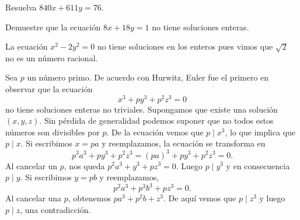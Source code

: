 %

\begin{exercise}
	Resuelva $840x+611y=76$. 
\end{exercise}

\begin{exercise}
	Demuestre que la ecuación $8x+18y=1$ no tiene soluciones enteras.
\end{exercise}

\begin{example}
	La ecuación $x^2-2y^2=0$ no tiene soluciones en los enteros pues vimos que
	$\sqrt{2}$ no es un número racional. 
\end{example}

\begin{example}
	Sea $p$ un número primo.  De acuerdo con Hurwitz, Euler fue el primero en
	observar que la ecuación
	\[
		x^3+py^3+p^2z^3=0
	\]
	no tiene soluciones enteras no triviales. Supongamos que existe una
	solución $(x,y,z)$. Sin pérdida de generalidad podemos suponer que no todos
	estos números son divisibles por $p$. De la ecuación vemos que $p\mid x^3$,
	lo que implica que $p\mid x$. Si escribimos $x=pa$ y reemplazamos, la
	ecuación se transforma en 
	\[
		p^3a^3+py^3+p^2z^3=(pa)^3+py^3+p^2z^3=0.
	\]
	Al cancelar un $p$, nos queda $p^2a^3+y^3+pz^3=0$. Luego $p\mid y^3$ y en consecuencia $p\mid y$. Si escribimos
	$y=pb$ y reemplazamos, 
	\[
		p^2a^3+p^3b^3+pz^3=0.
	\]
	Al cancelar una $p$, obtenemos $pa^3+p^2b+z^3$. De aquí vemos que $p\mid
	z^3$ y luego $p\mid z$, una contradicción.
\end{example}

